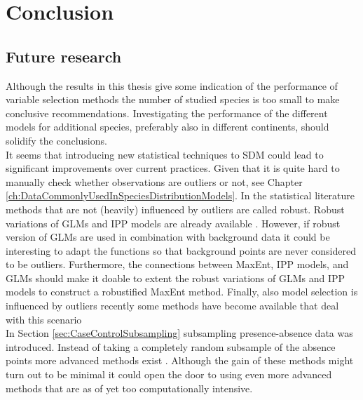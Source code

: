 \chapter{Conclusion}
\label{ch:Conclussion}
\section{}

\section{Future research}
Although the results in this thesis give some indication of the performance of variable selection methods the number of studied species is too small to make conclusive recommendations. Investigating the performance of the different models for additional species, preferably also in different continents, should solidify the conclusions.\\




It seems that introducing new statistical techniques to SDM could lead to significant improvements over current practices. Given that it is quite hard to manually check whether observations are outliers or not, see Chapter \ref{ch:DataCommonlyUsedInSpeciesDistributionModels}. In the statistical literature methods that are not (heavily) influenced by outliers are called robust. Robust variations of GLMs and IPP models are already available \parencite{cantoni_robust_2001, assuncao_robustness_1999}. However, if robust version of GLMs are used in combination with background data it could be interesting to adapt the functions so that background points are never considered to be outliers. Furthermore, the connections between MaxEnt, IPP models, and GLMs should make it doable to extent the robust variations of GLMs and IPP models to construct a robustified MaxEnt method. Finally, also model selection is influenced by outliers recently some methods have become available that deal with this scenario \parencite[e.g.][]{muller_robust_2009} \\

In Section \ref{sec:CaseControlSubsampling} subsampling presence-absence data was introduced. Instead of taking a completely random subsample of the absence points more advanced methods exist \parencite{king_logistic_2001}. Although the gain of these methods might turn out to be minimal it could open the door to using even more advanced methods that are as of yet too computationally intensive. \\

